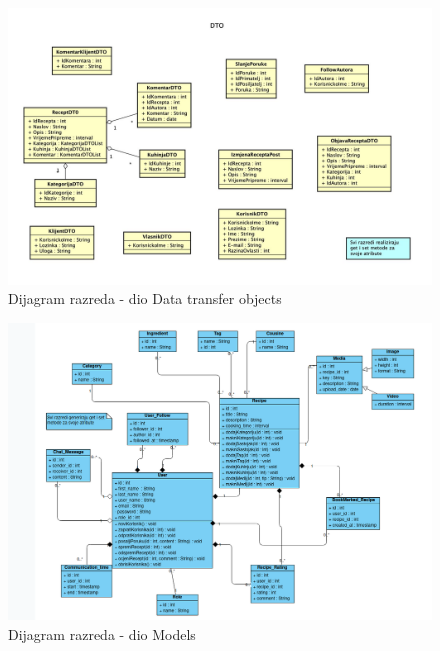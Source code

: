 		\begin{figure}[H]
			\includegraphics[scale=0.32]{dijagrami/razdijag_dto.jpeg}
			\centering
			\caption{Dijagram razreda - dio Data transfer objects}
			\label{fig:bpdiag}
		\end{figure}

		\eject

		\begin{figure}[H]
			\includegraphics[scale=0.4]{dijagrami/razdijag_model.png}
			\centering
			\caption{Dijagram razreda - dio Models}
			\label{fig:bpdiag}
		\end{figure}